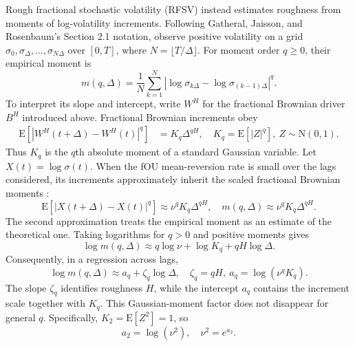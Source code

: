 \documentclass[12pt,a4paper]{article}
\numberwithin{equation}{section}
\numberwithin{table}{section}
\numberwithin{figure}{section}
\begin{document}
Rough fractional stochastic volatility (RFSV) instead estimates roughness from moments of log-volatility increments. Following Gatheral, Jaisson, and Rosenbaum's Section 2.1 notation, observe positive volatility on a grid $\sigma_0,\sigma_\Delta,\ldots,\sigma_{N\Delta}$ over $[0,T]$, where $N=\lfloor T/\Delta\rfloor$. For moment order $q\geq0$, their empirical moment is
\begin{equation}\label{eq:rfsv-moments}
m(q,\Delta)=\frac{1}{N}\sum_{k=1}^{N}
\left|\log\sigma_{k\Delta}-\log\sigma_{(k-1)\Delta}\right|^q.
\end{equation}
To interpret its slope and intercept, write $W^H$ for the fractional Brownian driver $B^H$ introduced above. Fractional Brownian increments obey
\begin{equation}\label{eq:rfsv-gaussian-moment}
\begin{aligned}
\mathrm E\!\left[\left|W^H(t+\Delta)-W^H(t)\right|^q\right]
&=K_q\Delta^{qH},\quad
K_q=\mathrm E[|Z|^q],\ Z\sim\mathrm N(0,1).
\end{aligned}
\end{equation}
Thus $K_q$ is the $q$th absolute moment of a standard Gaussian variable. Let $X(t)=\log\sigma(t)$. When the fOU mean-reversion rate is small over the lags considered, its increments approximately inherit the scaled fractional Brownian moments \cite{gatheral2018}:
\begin{equation}\label{eq:rfsv-scaled-moment}
\mathrm E\!\left[\left|X(t+\Delta)-X(t)\right|^q\right]
\approx\nu^qK_q\Delta^{qH},\quad
m(q,\Delta)\approx\nu^qK_q\Delta^{qH}.
\end{equation}
The second approximation treats the empirical moment as an estimate of the theoretical one. Taking logarithms for $q>0$ and positive moments gives
\begin{equation}\label{eq:rfsv-log-scaling} 
\log m(q,\Delta)\approx q\log\nu+\log K_q+qH\log\Delta.
\end{equation}
Consequently, in a regression across lags,
\begin{equation}\label{eq:rfsv-slope-intercept}
\log m(q,\Delta)\approx a_q+\zeta_q\log\Delta,
\quad \zeta_q=qH,\ a_q=\log(\nu^qK_q).
\end{equation}
The slope $\zeta_q$ identifies roughness $H$, while the intercept $a_q$ contains the increment scale together with $K_q$. This Gaussian-moment factor does not disappear for general $q$. Specifically, $K_2=\mathrm E[Z^2]=1$, so
\begin{equation}\label{eq:rfsv-nu-estimation}
a_2=\log(\nu^2),\quad \nu^2=e^{a_2}.
\end{equation}
\end{document}
